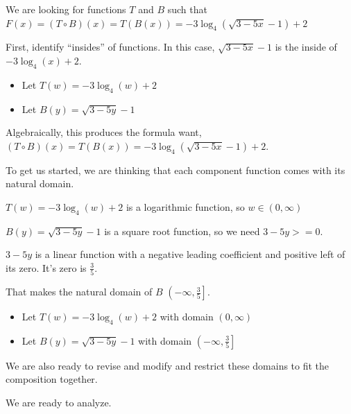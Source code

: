 \documentclass{ximera}
\begin{document}
\begin{idea}

\begin{center}
\end{center}









We are looking for functions $T$ and $B$ such that $F(x) = (T \circ B)(x) = T(B(x)) = -3 \log_4(\sqrt{3 - 5x} - 1) + 2$ 


First, identify ``insides'' of functions.  In this case, $\sqrt{3 - 5x} - 1$ is the inside of $-3 \log_4(x) + 2$. 



\begin{itemize}
\item Let $T(w) = -3 \log_4(w) + 2$ 
\item Let $B(y) = \sqrt{3 - 5y} - 1$ 
\end{itemize}

Algebraically, this produces the formula want,  $(T \circ B)(x) = T(B(x)) = -3 \log_4(\sqrt{3 - 5x} - 1) + 2$.


To get us started, we are thinking that each component function comes with its natural domain. 


$T(w) = -3 \log_4(w) + 2$ is a logarithmic function, so $w \in (0, \infty)$ 


$B(y) = \sqrt{3 - 5y} - 1$ is a square root function, so we need $3 - 5y >= 0$.

$3 - 5y$ is a linear function with a negative leading coefficient and positive left of its zero.  It's zero is $\frac{3}{5}$.

That makes the natural domain of $B$ $\left(-\infty, \frac{3}{5} \right]$. 



\begin{itemize}
\item Let $T(w) = -3 \log_4(w) + 2$ with domain $(0, \infty)$
\item Let $B(y) = \sqrt{3 - 5y} - 1$ with domain $\left(-\infty, \frac{3}{5} \right]$
\end{itemize}

We are also ready to revise and modify and restrict these domains to fit the composition together. 




We are ready to analyze. 


\end{idea}
\end{document}
